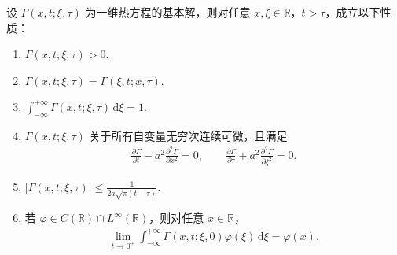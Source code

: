 \documentclass[../../main.tex]{subfiles}%
\begin{document}
\begin{proposition}[热方程基本解的性质]\label{proposition:热方程基本解的性质}
设 $\varGamma(x,t;\xi,\tau)$ 为一维热方程的基本解，则对任意 $x,\xi\in\mathbb{R}$，$t>\tau$，成立以下性质：
\begin{enumerate}[(1)]
\item $\varGamma(x,t;\xi,\tau)>0$.

\item $\varGamma(x,t;\xi,\tau)=\varGamma(\xi,t;x,\tau).$

\item $\int_{-\infty}^{+\infty}\varGamma(x,t;\xi,\tau)\,\mathrm{d}\xi=1.$

\item $\varGamma(x,t;\xi,\tau)$ 关于所有自变量无穷次连续可微，且满足
\begin{align*}
\frac{\partial\varGamma}{\partial t}-a^2\frac{\partial^2\varGamma}{\partial x^2}=0,\qquad 
\frac{\partial\varGamma}{\partial\tau}+a^2\frac{\partial^2\varGamma}{\partial\xi^2}=0.
\end{align*}

\item $|\varGamma(x,t;\xi,\tau)|\leqslant \frac{1}{2a\sqrt{\pi(t-\tau)}}.$

\item 若 $\varphi\in C(\mathbb{R})\cap L^\infty(\mathbb{R})$，则对任意 $x\in\mathbb{R}$，
\begin{align*}
\lim_{t\to 0^+}\int_{-\infty}^{+\infty}\varGamma(x,t;\xi,0)\varphi(\xi)\,\mathrm{d}\xi=\varphi(x).
\end{align*}
\end{enumerate}
\end{proposition}
\end{document}
